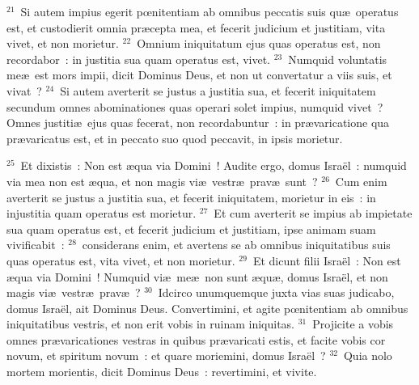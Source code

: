 ${}^{21}$~Si autem impius egerit pœnitentiam ab omnibus peccatis suis qu\ae\ operatus est, et custodierit omnia pr\ae cepta mea, et fecerit judicium et justitiam, vita vivet, et non morietur.
${}^{22}$~Omnium iniquitatum ejus quas operatus est, non recordabor~: in justitia sua quam operatus est, vivet.
${}^{23}$~Numquid voluntatis me\ae\ est mors impii, dicit Dominus Deus, et non ut convertatur a viis suis, et vivat~?
${}^{24}$~Si autem averterit se justus a justitia sua, et fecerit iniquitatem secundum omnes abominationes quas operari solet impius, numquid vivet~? Omnes justiti\ae\ ejus quas fecerat, non recordabuntur~: in pr\ae varicatione qua pr\ae varicatus est, et in peccato suo quod peccavit, in ipsis morietur.


${}^{25}$~Et dixistis~: Non est \ae qua via Domini~! Audite ergo, domus Isra\"el~: numquid via mea non est \ae qua, et non magis vi\ae\ vestr\ae\ prav\ae\ sunt~?
${}^{26}$~Cum enim averterit se justus a justitia sua, et fecerit iniquitatem, morietur in eis~: in injustitia quam operatus est morietur.
${}^{27}$~Et cum averterit se impius ab impietate sua quam operatus est, et fecerit judicium et justitiam, ipse animam suam vivificabit~:
${}^{28}$~considerans enim, et avertens se ab omnibus iniquitatibus suis quas operatus est, vita vivet, et non morietur.
${}^{29}$~Et dicunt filii Isra\"el~: Non est \ae qua via Domini~! Numquid vi\ae\ me\ae\ non sunt \ae qu\ae , domus Isra\"el, et non magis vi\ae\ vestr\ae\ prav\ae~?
${}^{30}$~Idcirco unumquemque juxta vias suas judicabo, domus Isra\"el, ait Dominus Deus. Convertimini, et agite pœnitentiam ab omnibus iniquitatibus vestris, et non erit vobis in ruinam iniquitas.
${}^{31}$~Projicite a vobis omnes pr\ae varicationes vestras in quibus pr\ae varicati estis, et facite vobis cor novum, et spiritum novum~: et quare moriemini, domus Isra\"el~?
${}^{32}$~Quia nolo mortem morientis, dicit Dominus Deus~: revertimini, et vivite.

